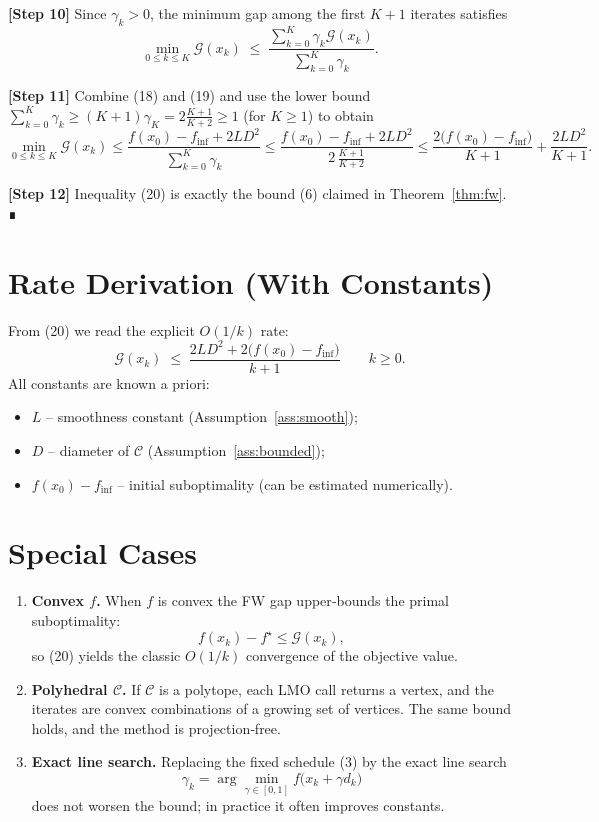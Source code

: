 \documentclass{article}
\newcommand{\C}{\mathcal{C}}
\begin{document}
\noindent\textbf{[Step 10]} Since $\gamma_{k}>0$, the minimum gap among the first $K+1$ iterates satisfies
\[
\min_{0\le k\le K}\mathcal{G}(x_{k})
\;\le\;
\frac{\sum_{k=0}^{K}\gamma_{k}\mathcal{G}(x_{k})}{\sum_{k=0}^{K}\gamma_{k}}.
\tag{19}
\]

\noindent\textbf{[Step 11]} Combine (18) and (19) and use the lower bound $\sum_{k=0}^{K}\gamma_{k}\ge (K+1)\gamma_{K}=2\frac{K+1}{K+2}\ge 1$ (for $K\ge1$) to obtain
\[
\min_{0\le k\le K}\mathcal{G}(x_{k})
\le
\frac{f(x_{0})-f_{\inf}+2L D^{2}}{\sum_{k=0}^{K}\gamma_{k}}
\le
\frac{f(x_{0})-f_{\inf}+2L D^{2}}{\,2\,\frac{K+1}{K+2}\,}
\le
\frac{2\bigl(f(x_{0})-f_{\inf}\bigr)}{K+1}
+\frac{2L D^{2}}{K+1}.
\tag{20}
\]

\noindent\textbf{[Step 12]} Inequality (20) is exactly the bound (6) claimed in Theorem~\ref{thm:fw}. ∎

\section*{Rate Derivation (With Constants)}
From (20) we read the explicit $O(1/k)$ rate:
\[
\boxed{
\displaystyle
\mathcal{G}(x_{k})\;\le\;
\frac{2L D^{2}+2\bigl(f(x_{0})-f_{\inf}\bigr)}{k+1}
}
\qquad k\ge0.
\]
All constants are known a priori:
\begin{itemize}
\item $L$ – smoothness constant (Assumption~\ref{ass:smooth});
\item $D$ – diameter of $\C$ (Assumption~\ref{ass:bounded});
\item $f(x_{0})-f_{\inf}$ – initial suboptimality (can be estimated numerically).
\end{itemize}

\section*{Special Cases}
\begin{enumerate}[label=\alph*.]
\item \textbf{Convex $f$.} When $f$ is convex the FW gap upper‑bounds the primal suboptimality:
\[
f(x_{k})-f^{\star}\le \mathcal{G}(x_{k}),
\]
so (20) yields the classic $O(1/k)$ convergence of the objective value.
\item \textbf{Polyhedral $\C$.} If $\C$ is a polytope, each LMO call returns a vertex, and the iterates are convex combinations of a growing set of vertices. The same bound holds, and the method is projection‑free.
\item \textbf{Exact line search.} Replacing the fixed schedule (3) by the exact line search
\[
\gamma_{k}=\arg\min_{\gamma\in[0,1]} f\bigl(x_{k}+\gamma d_{k}\bigr)
\]
does not worsen the bound; in practice it often improves constants.
\end{enumerate}
\end{document}
